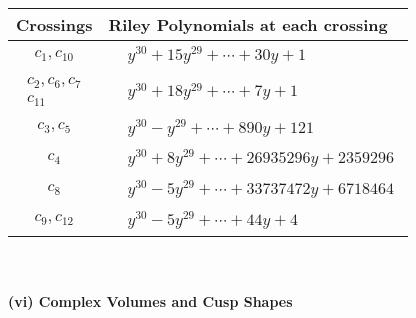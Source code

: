 \documentclass[1p]{elsarticle_modified}
\theoremstyle{definition}
\begin{document}
\begin{tabular}{m{50pt}|m{274pt}}
Crossings & \hspace{64pt}Riley Polynomials at each crossing \\
\hline $$\begin{aligned}c_{1},c_{10}\end{aligned}$$&$\begin{aligned}
&y^{30}+15 y^{29}+\cdots+30 y+1
\end{aligned}$\\
\hline $$\begin{aligned}c_{2},c_{6},c_{7}\\c_{11}\end{aligned}$$&$\begin{aligned}
&y^{30}+18 y^{29}+\cdots+7 y+1
\end{aligned}$\\
\hline $$\begin{aligned}c_{3},c_{5}\end{aligned}$$&$\begin{aligned}
&y^{30}- y^{29}+\cdots+890 y+121
\end{aligned}$\\
\hline $$\begin{aligned}c_{4}\end{aligned}$$&$\begin{aligned}
&y^{30}+8 y^{29}+\cdots+26935296 y+2359296
\end{aligned}$\\
\hline $$\begin{aligned}c_{8}\end{aligned}$$&$\begin{aligned}
&y^{30}-5 y^{29}+\cdots+33737472 y+6718464
\end{aligned}$\\
\hline $$\begin{aligned}c_{9},c_{12}\end{aligned}$$&$\begin{aligned}
&y^{30}-5 y^{29}+\cdots+44 y+4
\end{aligned}$\\
\hline
\end{tabular}\\~\\
\newpage\flushleft \textbf{(vi) Complex Volumes and Cusp Shapes}
\end{document}
